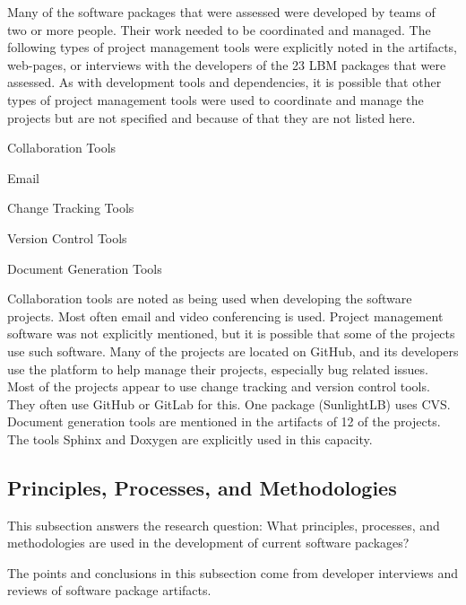 \documentclass[12pt, notitlepage]{article}
\begin{document}
Many of the software packages that were assessed were developed by teams of two or more people. Their work needed to be coordinated and managed. The following types of project management tools were explicitly noted in the artifacts, web-pages, or interviews with the developers of the 23 LBM packages that were assessed. As with development tools and dependencies, it is possible that other types of project management tools were used to coordinate and manage the projects but are not specified and because of that they are not listed here.

	\begin{multicols}{2}	
		\begin{itemize}
		\end{itemize}
	\end{multicols}


Collaboration tools are noted as being used when developing the software projects. Most often email and video conferencing is used. Project management software was not explicitly mentioned, but it is possible that some of the projects use such software. Many of the projects are located on GitHub, and its developers use the platform to help manage their projects, especially bug related issues. Most of the projects appear to use change tracking and version control tools. They often use GitHub or GitLab for this. One package (SunlightLB) uses CVS. Document generation tools are mentioned in the artifacts of 12 of the projects. The tools Sphinx and Doxygen are explicitly used in this capacity. 

\subsection{Principles, Processes, and Methodologies}\label{prinprocmeth}

This subsection answers the research question: What principles, processes, and methodologies are used in the development of current software packages?

The points and conclusions in this subsection come from developer interviews and reviews of software package artifacts.
\end{document}
